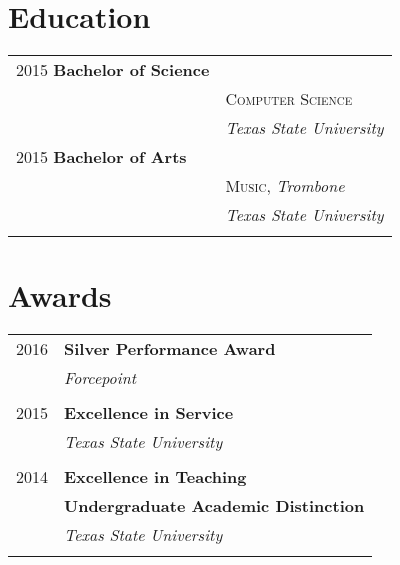 \documentclass[10pt]{article} %
\begin{document}
\begin{minipage}[t]{0.44\textwidth}

\section{Education} 

\begin{tabular}{ll} %


2015 \textbf{Bachelor of Science} \\ 
& \textsc{Computer Science} \\ 
& \textit{Texas State University}\\

	 

2015 \textbf{Bachelor of Arts} \\ 
& \textsc{Music}, \textit{Trombone}\\ 
& \textit{Texas State University}\\ \\

\end{tabular}


\section{Awards} 

\begin{tabular}{rl}
2016     & \textbf{Silver Performance Award}\\
& \textit{Forcepoint}\\ \\
2015     & \textbf{Excellence in Service}\\
& \textit{Texas State University}\\ \\
2014	 & \textbf{Excellence in Teaching}\\
	 & \textbf{Undergraduate Academic Distinction}\\
& \textit{Texas State University}\\ \\


\end{tabular}
\end{minipage}
\end{document}
